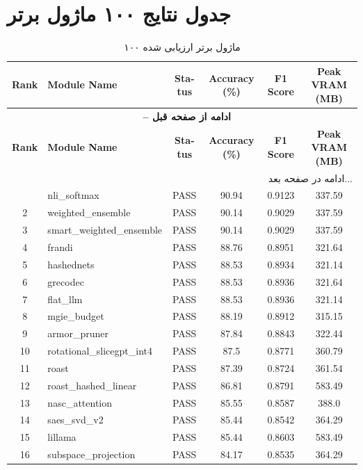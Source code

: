 \documentclass[12pt,a4paper]{report}
\theoremstyle{definition}
\begin{document}
\section{جدول نتایج ۱۰۰ ماژول برتر}
\begin{latin}
\begin{longtable}{@{}|c|l|c|c|c|c|@{}}
\caption{۱۰۰ ماژول برتر ارزیابی شده} \label{tab:top100} \\
\hline
\textbf{Rank} & \textbf{Module Name} & \textbf{Status} & \textbf{Accuracy (\%)} & \textbf{F1 Score} & \textbf{Peak VRAM (MB)} \\ \hline
\endfirsthead
\multicolumn{6}{c}{{\bfseries \tablename\ \thetable{} -- ادامه از صفحه قبل}} \\
\hline
\textbf{Rank} & \textbf{Module Name} & \textbf{Status} & \textbf{Accuracy (\%)} & \textbf{F1 Score} & \textbf{Peak VRAM (MB)} \\ \hline
\endhead
\hline \multicolumn{6}{|r|}{{ادامه در صفحه بعد...}} \\ \hline
\endfoot
\hline
\endlastfoot
1 & nli\_softmax & PASS & 90.94 & 0.9123 & 337.59 \\
\hline
2 & weighted\_ensemble & PASS & 90.14 & 0.9029 & 337.59 \\
\hline
3 & smart\_weighted\_ensemble & PASS & 90.14 & 0.9029 & 337.59 \\
\hline
4 & frandi & PASS & 88.76 & 0.8951 & 321.64 \\
\hline
5 & hashednets & PASS & 88.53 & 0.8934 & 321.14 \\
\hline
6 & grecodec & PASS & 88.53 & 0.8936 & 321.64 \\
\hline
7 & flat\_llm & PASS & 88.53 & 0.8936 & 321.14 \\
\hline
8 & mgie\_budget & PASS & 88.19 & 0.8912 & 315.15 \\
\hline
9 & armor\_pruner & PASS & 87.84 & 0.8843 & 322.44 \\
\hline
10 & rotational\_slicegpt\_int4 & PASS & 87.5 & 0.8771 & 360.79 \\
\hline
11 & roast & PASS & 87.39 & 0.8724 & 361.54 \\
\hline
12 & roast\_hashed\_linear & PASS & 86.81 & 0.8791 & 583.49 \\
\hline
13 & nasc\_attention & PASS & 85.55 & 0.8587 & 388.0 \\
\hline
14 & saes\_svd\_v2 & PASS & 85.44 & 0.8542 & 364.29 \\
\hline
15 & lillama & PASS & 85.44 & 0.8603 & 583.49 \\
\hline
16 & subspace\_projection & PASS & 84.17 & 0.8535 & 364.29 \\

\end{longtable}
\end{latin}
\end{document}

